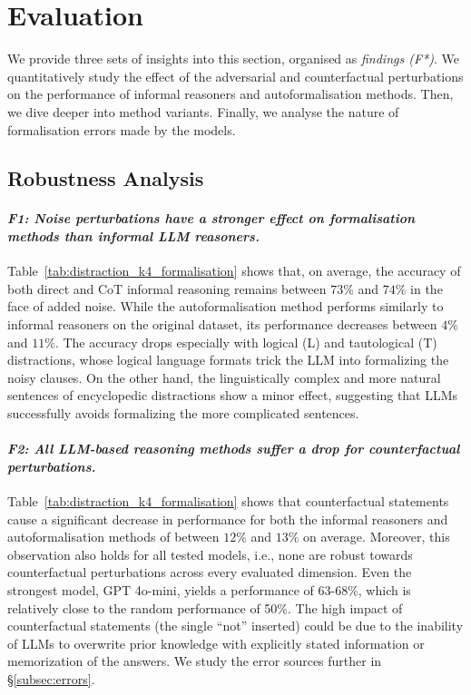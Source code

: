 \section{Evaluation}
We provide three sets of insights into this section, organised as \textit{findings (F*)}. We quantitatively study the effect of the adversarial and counterfactual perturbations on the performance of informal reasoners and autoformalisation methods. Then, we dive deeper into method variants. Finally, 
we analyse the nature of formalisation errors made by the models.

\subsection{Robustness Analysis}
\paragraph{\textbf{\emph{F1: Noise perturbations have a stronger effect on formalisation methods than informal \ac{LLM} reasoners.}}}
Table~\ref{tab:distraction_k4_formalisation} shows that, on average, the accuracy of both direct and \ac{CoT} informal reasoning remains between $73\%$ and $74\%$ in the face of added noise. While the autoformalisation method performs similarly to informal reasoners on the original dataset, its performance decreases between $4\%$ and $11\%$. The accuracy drops especially with logical (L) and tautological (T) distractions, whose logical language formats trick the \ac{LLM} into formalizing the noisy clauses. On the other hand, the linguistically complex and more natural sentences of encyclopedic distractions show a minor effect, suggesting that \acp{LLM} successfully avoids formalizing the more complicated sentences.

\paragraph{\textbf{\emph{F2: All \ac{LLM}-based reasoning methods suffer a drop for counterfactual perturbations.}}} %
Table~\ref{tab:distraction_k4_formalisation} shows that counterfactual statements cause a significant decrease in performance for both the informal reasoners and autoformalisation methods of between $12\%$ and $13\%$ on average. 
Moreover, this observation also holds for all tested models, i.e., none are robust towards counterfactual perturbations across every evaluated dimension. Even the strongest model, GPT 4o-mini, yields a performance of 63-68\%, which is relatively close to the random performance of 50\%. The high impact of counterfactual statements (the single ``not'' inserted) could be due to the inability of \acp{LLM} to overwrite prior knowledge with explicitly stated information or memorization of the answers. We study the error sources further in §\ref{subsec:errors}.  

